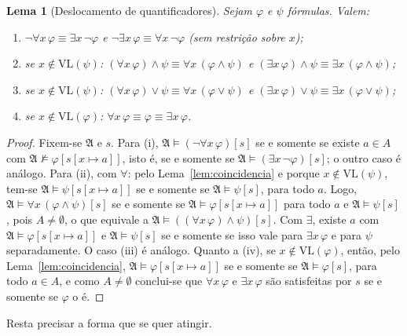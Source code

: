 \documentclass[12pt,a4paper,oneside]{report}
\theoremstyle{tituloplain}
\newtheorem{lema}[teorema]{Lema}
\theoremstyle{titulodef}
\begin{document}
\begin{lema}[Deslocamento de quantificadores]\label{lem:deslocamento}
Sejam $\varphi$ e $\psi$ fórmulas. Valem:
\begin{enumerate}
  \item $\neg\forall x\,\varphi\equiv\exists x\,\neg\varphi$ e $\neg\exists x\,\varphi\equiv\forall x\,\neg\varphi$ (sem restrição sobre $x$);
  \item se $x\notin\mathrm{VL}(\psi)$: $(\forall x\,\varphi)\wedge\psi\equiv\forall x\,(\varphi\wedge\psi)$ e $(\exists x\,\varphi)\wedge\psi\equiv\exists x\,(\varphi\wedge\psi)$;
  \item se $x\notin\mathrm{VL}(\psi)$: $(\forall x\,\varphi)\vee\psi\equiv\forall x\,(\varphi\vee\psi)$ e $(\exists x\,\varphi)\vee\psi\equiv\exists x\,(\varphi\vee\psi)$;
  \item se $x\notin\mathrm{VL}(\varphi)$: $\forall x\,\varphi\equiv\varphi\equiv\exists x\,\varphi$.
\end{enumerate}
\end{lema}
\begin{proof}
Fixem-se $\mathfrak{A}$ e $s$. Para (i), $\mathfrak{A}\models(\neg\forall x\,\varphi)[s]$ se e somente se existe $a\in A$ com $\mathfrak{A}\not\models\varphi[s[x\mapsto a]]$, isto é, se e somente se $\mathfrak{A}\models(\exists x\,\neg\varphi)[s]$; o outro caso é análogo. Para (ii), com $\forall$: pelo Lema~\ref{lem:coincidencia} e porque $x\notin\mathrm{VL}(\psi)$, tem-se $\mathfrak{A}\models\psi[s[x\mapsto a]]$ se e somente se $\mathfrak{A}\models\psi[s]$, para todo $a$. Logo, $\mathfrak{A}\models\forall x\,(\varphi\wedge\psi)[s]$ se e somente se $\mathfrak{A}\models\varphi[s[x\mapsto a]]$ para todo $a$ e $\mathfrak{A}\models\psi[s]$, pois $A\neq\emptyset$, o que equivale a $\mathfrak{A}\models((\forall x\,\varphi)\wedge\psi)[s]$. Com $\exists$, existe $a$ com $\mathfrak{A}\models\varphi[s[x\mapsto a]]$ e $\mathfrak{A}\models\psi[s]$ se e somente se isso vale para $\exists x\,\varphi$ e para $\psi$ separadamente. O caso (iii) é análogo. Quanto a (iv), se $x\notin\mathrm{VL}(\varphi)$, então, pelo Lema~\ref{lem:coincidencia}, $\mathfrak{A}\models\varphi[s[x\mapsto a]]$ se e somente se $\mathfrak{A}\models\varphi[s]$, para todo $a\in A$, e como $A\neq\emptyset$ conclui-se que $\forall x\,\varphi$ e $\exists x\,\varphi$ são satisfeitas por $s$ se e somente se $\varphi$ o é.
\end{proof}

Resta precisar a forma que se quer atingir.
\end{document}
